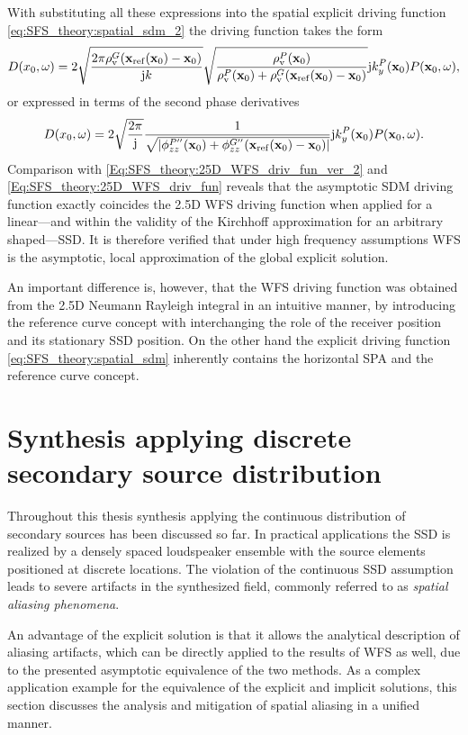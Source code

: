 With substituting all these expressions into the spatial explicit driving function \eqref{eq:SFS_theory:spatial_sdm_2} the driving function takes the form
\begin{equation}
D(x_0,\omega) =
2\sqrt{\frac{2\pi  \rho_\mathrm{v}^G(\mathbf{x}_{\mathrm{ref}}(\mathbf{x}_0)-\mathbf{x}_0)}{\mathrm{j} k}} 
\sqrt{\frac{\rho_\mathrm{v}^P(\mathbf{x}_0) }{\rho_\mathrm{v}^P(\mathbf{x}_0) + \rho_\mathrm{v}^G(\mathbf{x}_{\mathrm{ref}}(\mathbf{x}_0)-\mathbf{x}_0)}}
\mathrm{j} k_y^{P}(\mathbf{x}_0)
P(\mathbf{x}_0,\omega),
\end{equation}
or expressed in terms of the second phase derivatives 
\begin{equation}
D(x_0,\omega) =
2\sqrt{\frac{2\pi }{\mathrm{j} }} 
\frac{ 1 }{\sqrt{|\phi^{P''}_{zz}(\mathbf{x}_0) + \phi^{G''}_{zz}(\mathbf{x}_{\mathrm{ref}}(\mathbf{x}_0)-\mathbf{x}_0)|}}
\mathrm{j} k_y^{P}(\mathbf{x}_0)
P(\mathbf{x}_0,\omega).
\end{equation}
Comparison with \eqref{Eq:SFS_theory:25D_WFS_driv_fun_ver_2} and \eqref{Eq:SFS_theory:25D_WFS_driv_fun} reveals that the asymptotic SDM driving function exactly coincides the 2.5D WFS driving function when applied for a linear---and within the validity of the Kirchhoff approximation for an arbitrary shaped---SSD.
It is therefore verified that under high frequency assumptions WFS is the asymptotic, local approximation of the global explicit solution.

An important difference is, however, that the WFS driving function was obtained from the 2.5D Neumann Rayleigh integral in an intuitive manner, by introducing the reference curve concept with interchanging the role of the receiver position and its stationary SSD position. 
On the other hand the explicit driving function \eqref{eq:SFS_theory:spatial_sdm} inherently contains the horizontal SPA and the reference curve concept.

\section{Synthesis applying discrete secondary source distribution}
\label{Sec:Aliasing}

Throughout this thesis synthesis applying the continuous distribution of secondary sources has been discussed so far.
In practical applications the SSD is realized by a densely spaced loudspeaker ensemble with the source elements positioned at discrete locations.
The violation of the continuous SSD assumption leads to severe artifacts in the synthesized field, commonly referred to as \emph{spatial aliasing phenomena}.

An advantage of the explicit solution is that it allows the analytical description of aliasing artifacts, which can be directly applied to the results of WFS as well, due to the presented asymptotic equivalence of the two methods.
As a complex application example for the equivalence of the explicit and implicit solutions, this section discusses the analysis and mitigation of spatial aliasing in a unified manner.

